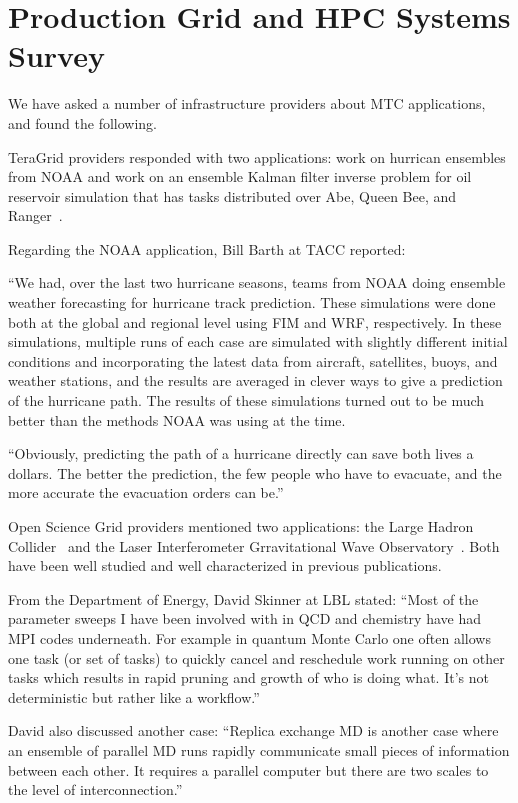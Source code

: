\documentclass[10pt,letterpaper]{article}
\begin{document}
\section{Production Grid and HPC Systems Survey\label{sec:PGIapps}}

We have asked a number of infrastructure providers about MTC applications, and found the following.

TeraGrid providers responded with two applications: work on hurrican ensembles from NOAA and work on an ensemble Kalman filter inverse problem for oil reservoir simulation that has tasks distributed over Abe, Queen Bee, and Ranger~\cite{yaakoub}.

Regarding the NOAA application, Bill Barth at TACC reported:

``We had, over the last two hurricane seasons, teams from NOAA doing ensemble weather forecasting for hurricane track prediction. These simulations were done both at the global and regional level using FIM and WRF, respectively. In these simulations, multiple runs of each case are simulated with slightly different initial conditions and incorporating the latest data from aircraft, satellites, buoys, and weather stations, and the results are averaged in clever ways to give a prediction of the hurricane path. The results of these simulations turned out to be much better than the methods NOAA was using at the time.

``Obviously, predicting the path of a hurricane directly can save both lives a dollars. The better the prediction, the few people who have to evacuate, and the more accurate the evacuation orders can be.''

Open Science Grid providers mentioned two applications: the Large Hadron Collider~\cite{CMS} and the Laser Interferometer Grravitational Wave Observatory~\cite{ligo}.  Both have been well studied and well characterized in previous publications.

From the Department of Energy, David Skinner at LBL stated:
``Most of the parameter sweeps I have been involved with in QCD and
chemistry have had MPI codes underneath. For example in quantum Monte
Carlo one often allows one task (or set of tasks) to quickly cancel
and reschedule work running on other tasks which results in rapid
pruning and growth of who is doing what. It's not deterministic but
rather like a workflow.''

David also discussed another case:
``Replica exchange MD is another case where an ensemble of parallel MD
runs rapidly communicate small pieces of information between each
other. It requires a parallel computer but there are two scales to the
level of interconnection.''
\end{document}
